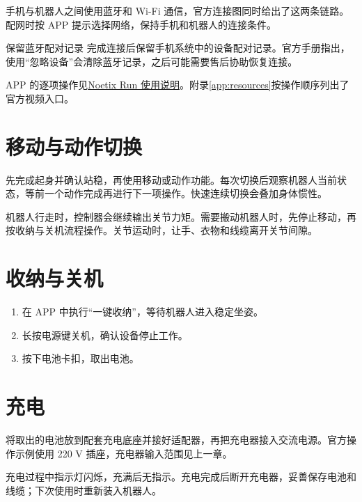 手机与机器人之间使用蓝牙和 Wi-Fi 通信，官方连接图同时给出了这两条链路。配网时按 APP 提示选择网络，保持手机和机器人的连接条件。
\begin{remark}{保留蓝牙配对记录}
完成连接后保留手机系统中的设备配对记录。官方手册指出，使用“忽略设备”会清除蓝牙记录，之后可能需要售后协助恢复连接。
\end{remark}
APP 的逐项操作见\href{http://app-file.noetixrobotics.com/page/appUseCn.html}{Noetix Run 使用说明}。附录\ref{app:resources}按操作顺序列出了官方视频入口。
\section{移动与动作切换}
先完成起身并确认站稳，再使用移动或动作功能。每次切换后观察机器人当前状态，等前一个动作完成再进行下一项操作。快速连续切换会叠加身体惯性。

机器人行走时，控制器会继续输出关节力矩。需要搬动机器人时，先停止移动，再按收纳与关机流程操作。关节运动时，让手、衣物和线缆离开关节间隙。
\section{收纳与关机}
\begin{enumerate}
\item 在 APP 中执行“一键收纳”，等待机器人进入稳定坐姿。
\item 长按电源键关机，确认设备停止工作。
\item 按下电池卡扣，取出电池。
\end{enumerate}
\section{充电}
将取出的电池放到配套充电底座并接好适配器，再把充电器接入交流电源。官方操作示例使用 220 V 插座，充电器输入范围见上一章。

充电过程中指示灯闪烁，充满后无指示。充电完成后断开充电器，妥善保存电池和线缆；下次使用时重新装入机器人。
